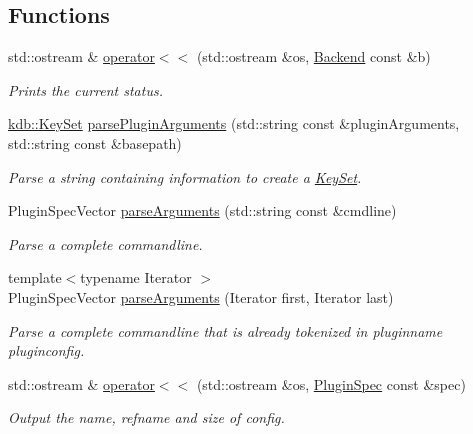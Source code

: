 \subsection*{Functions}
\begin{DoxyCompactItemize}
\item 
std\+::ostream \& \hyperlink{namespacekdb_1_1tools_a10b59213ee542e33c7ecc481d4476a79}{operator$<$$<$} (std\+::ostream \&os, \hyperlink{classkdb_1_1tools_1_1Backend}{Backend} const \&b)
\begin{DoxyCompactList}\small\item\em Prints the current status. \end{DoxyCompactList}\item 
\hyperlink{classkdb_1_1KeySet}{kdb\+::\+Key\+Set} \hyperlink{namespacekdb_1_1tools_ad4fdf9477ede38a219b02a7442965f6d}{parse\+Plugin\+Arguments} (std\+::string const \&plugin\+Arguments, std\+::string const \&basepath)
\begin{DoxyCompactList}\small\item\em Parse a string containing information to create a \hyperlink{classkdb_1_1KeySet}{Key\+Set}. \end{DoxyCompactList}\item 
Plugin\+Spec\+Vector \hyperlink{namespacekdb_1_1tools_a3c08f8fdabc7002ff497b247cba6bb21}{parse\+Arguments} (std\+::string const \&cmdline)
\begin{DoxyCompactList}\small\item\em Parse a complete commandline. \end{DoxyCompactList}\item 
{\footnotesize template$<$typename Iterator $>$ }\\Plugin\+Spec\+Vector \hyperlink{namespacekdb_1_1tools_ab7ffe14ed9cab32c07ddb55a8a65973a}{parse\+Arguments} (Iterator first, Iterator last)
\begin{DoxyCompactList}\small\item\em Parse a complete commandline that is already tokenized in pluginname pluginconfig. \end{DoxyCompactList}\item 
\mbox{\label{namespacekdb_1_1tools_a7a731fb15351e62222ae8763ca6aa876}} 
std\+::ostream \& \hyperlink{namespacekdb_1_1tools_a7a731fb15351e62222ae8763ca6aa876}{operator$<$$<$} (std\+::ostream \&os, \hyperlink{classkdb_1_1tools_1_1PluginSpec}{Plugin\+Spec} const \&spec)
\begin{DoxyCompactList}\small\item\em Output the name, refname and size of config. \end{DoxyCompactList}\item 

\end{DoxyCompactItemize}
